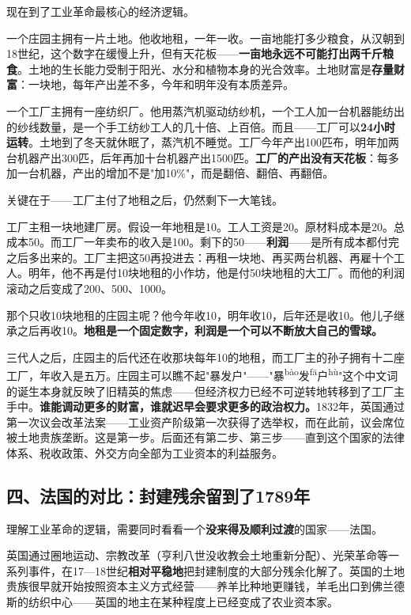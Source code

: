 \documentclass[a4paper,12pt]{ctexart}
\newcommand{\ruby}[2]{#1\textsuperscript{#2}}
\begin{document}
现在到了工业革命最核心的经济逻辑。

一个庄园主拥有一片土地。他收地租，一年一收。一亩地能打多少粮食，从汉朝到18世纪，这个数字在缓慢上升，但有天花板——\textbf{一亩地永远不可能打出两千斤粮食}。土地的生长能力受制于阳光、水分和植物本身的光合效率。土地财富是\textbf{存量财富}：一块地，每年产出差不多，今年和明年没有本质差异。

一个工厂主拥有一座纺织厂。他用蒸汽机驱动纺纱机，一个工人加一台机器能纺出的纱线数量，是一个手工纺纱工人的几十倍、上百倍。而且——工厂可以\textbf{24小时运转}。土地到了冬天就休眠了，蒸汽机不睡觉。工厂今年产出100匹布，明年加两台机器产出300匹，后年再加十台机器产出1500匹。\textbf{工厂的产出没有天花板}：每多加一台机器，产出的增加不是"加10\%"，而是翻倍、翻倍、再翻倍。

关键在于——工厂主付了地租之后，仍然剩下一大笔钱。

工厂主租一块地建厂房。假设一年地租是10。工人工资是20。原材料成本是20。总成本50。而工厂一年卖布的收入是100。剩下的50——\textbf{利润}——是所有成本都付完之后多出来的。工厂主把这50再投进去：再租一块地、再买两台机器、再雇十个工人。明年，他不再是付10块地租的小作坊，他是付50块地租的大工厂。而他的利润滚动之后变成了200、500、1000。

那个只收10块地租的庄园主呢？他今年收10，明年收10，后年还是收10。他儿子继承之后再收10。\textbf{地租是一个固定数字，利润是一个可以不断放大自己的雪球。}

三代人之后，庄园主的后代还在收那块每年10的地租，而工厂主的孙子拥有十二座工厂，年收入是五万。庄园主可以瞧不起"暴发户"——"\ruby{暴}{bào}\ruby{发}{fā}\ruby{户}{hù}"这个中文词的诞生本身就反映了旧精英的焦虑——但经济权力已经不可逆转地转移到了工厂主手中。\textbf{谁能调动更多的财富，谁就迟早会要求更多的政治权力。}1832年，英国通过第一次议会改革法案——工业资产阶级第一次获得了选举权，而在此前，议会席位被土地贵族垄断。这是第一步。后面还有第二步、第三步——直到这个国家的法律体系、税收政策、外交方向全部为工业资本的利益服务。

\subsection*{四、法国的对比：封建残余留到了1789年}

理解工业革命的逻辑，需要同时看看一个\textbf{没来得及顺利过渡}的国家——法国。

英国通过圈地运动、宗教改革（亨利八世没收教会土地重新分配）、光荣革命等一系列事件，在17—18世纪\textbf{相对平稳地}把封建制度的大部分残余化解了。英国的土地贵族很早就开始按照资本主义方式经营——养羊比种地更赚钱，羊毛出口到佛兰德斯的纺织中心——英国的地主在某种程度上已经变成了农业资本家。
\end{document}

